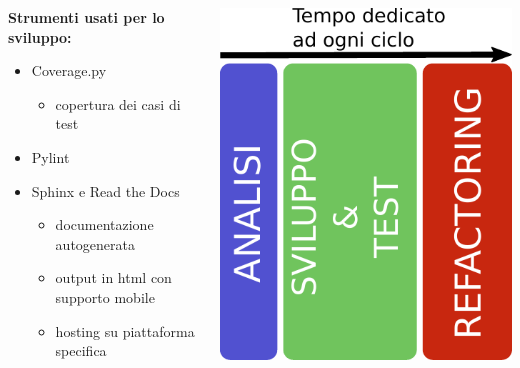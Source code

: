 \documentclass{beamer}
\begin{document}
\begin{frame}[fragile]{\secname}
\begin{columns}
\begin{column}{0.6\textwidth}
			\textbf{Strumenti usati per lo sviluppo:}
			\begin{itemize}
				\item Coverage.py
					\begin{itemize}
						\item copertura dei casi di test
					\end{itemize}
				\item Pylint
				\item Sphinx e Read the Docs
					\begin{itemize}
						\item documentazione autogenerata
						\item output in html con supporto mobile
						\item hosting su piattaforma specifica
					\end{itemize}
			\end{itemize}
		\end{column}
		\begin{column}{0.4\textwidth}
			\begin{flushright}
				\includegraphics[scale=0.55]{timebox}
			\end{flushright}
		\end{column}
	\end{columns}
\end{frame}
\end{document}
